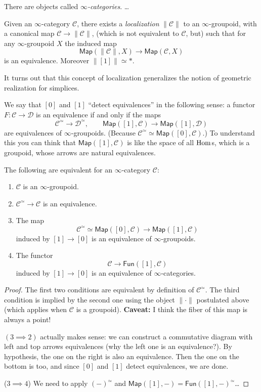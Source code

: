 \noindent
There are objects called {\it $\infty$-categories}. …

\medskip\noindent
Given an $\infty$-category $\mathcal{C}$, there exists
a {\it localization} $\|\mathcal{C}\|$ to an
$\infty$-groupoid, with a canonical map
$\mathcal{C} \to \|\mathcal{C}\|$,
(which is not equivalent to $\mathcal{C}$, but)
such that for any $\infty$-groupoid $X$ 
the induced map
$$
\mathsf{Map}(\|\mathcal{C}\|,X) \to \mathsf{Map}(\mathcal{C},X)
$$
is an equivalence.
Moreover  $\|[1]\|\simeq *$.

It turns out that this concept of localization
generalizes the notion of geometric realization
for simplices.

\medskip\noindent
We say that $[0]$ and $[1]$ ``detect equivalences''
in the following sense:
a functor $F: \mathcal{C} \to \mathcal{D}$ is
an equivalence if and only if the maps
$$
\mathcal{C}^{\simeq} \to \mathcal{D}^{\simeq},\qquad 
\mathsf{Map}([1],\mathcal{C})\to\mathsf{Map}([1],\mathcal{D})
$$
are equivalences of $\infty$-groupoids.
(Because $\mathcal{C}^\simeq \simeq \mathsf{Map}([0], \mathcal{C})$.)
To understand this you can think that
$\mathsf{Map}([1],\mathcal{C})$ is like
the space of all $\mathop{\mathrm{Hom}}\nolimits$s, which is a groupoid,
whose arrows are natural equivalences.

\begin{lemma}
\label{lemma-equivalences-for-infty-groupoids}
The following are equivalent for an $\infty$-category $\mathcal{C}$:
\begin{enumerate}
\item $\mathcal{C}$ is an $\infty$-groupoid.

\item $\mathcal{C}^\simeq \to \mathcal{C}$ is an equivalence.

\item The map
$$
\mathcal{C}^\simeq \simeq \mathsf{Map}([0],\mathcal{C})
\to \mathsf{Map}([1],\mathcal{C})
$$
induced by $[1] \to [0]$ is an equivalence
of $\infty$-groupoids.

\item The functor
$$
\mathcal{C}\to \mathsf{Fun}([1],\mathcal{C})
$$
induced by $[1]\to [0]$ is an equivalence
of $\infty$-categories.
\end{enumerate}
\end{lemma}

\begin{proof}
The first two conditions are equivalent by definition
of $\mathcal{C}^{\simeq}$. The third condition is implied
by the second one using the object $\|\cdot\|$ postulated above
(which applies when $\mathcal{C}$ is a groupoid).
{\bf Caveat:} I think the fiber of this map is always a point!

$(3\implies 2)$ actually makes sense:
we can construct a commutative diagram with left and top arrows
equivalences (why the left one is an equivalence?).
By hypothesis, the one on the right is also an equivalence.
Then the one on the bottom is too, and since $[0]$ and $[1]$ 
detect equivalences, we are done.

($3 \implies 4$) We need to apply $(-)^\simeq$ and
$\mathsf{Map}([1],-)=\mathsf{Fun}([1],-)^\simeq$…
\end{proof}

